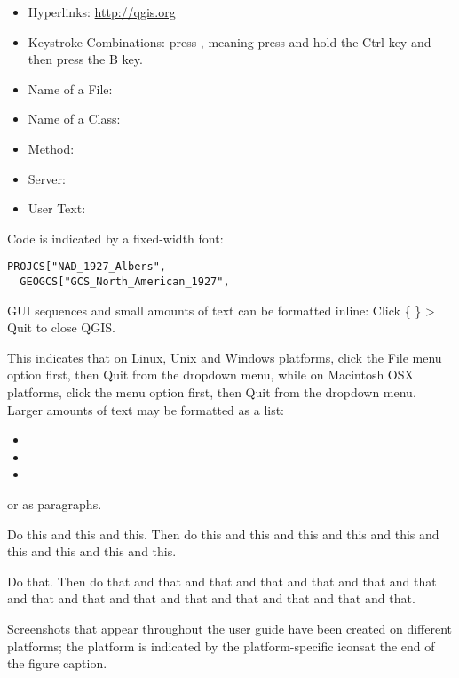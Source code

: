 \begin{itemize}[label=--]
\item Hyperlinks: \url{http://qgis.org}
\item Keystroke Combinations: press , meaning press and hold the Ctrl key and then press the B key.
\item Name of a File: 
\item Name of a Class: 
\item Method: 
\item Server: 
\item User Text: 
\end{itemize}

Code is indicated by a fixed-width font:
\begin{verbatim}
PROJCS["NAD_1927_Albers",
  GEOGCS["GCS_North_American_1927",
\end{verbatim}


GUI sequences and small amounts of text can be formatted inline: Click \{\nix{} \} > Quit to close QGIS.

This indicates that on Linux, Unix and Windows platforms, click the File menu option first, then Quit from the dropdown menu, while on Macintosh OSX platforms, click the \qg menu option first, then Quit from the dropdown menu. Larger amounts of text may be formatted as a list:

\begin{itemize}
\item {} 
\item {} 
\item {}
\end{itemize}

or as paragraphs.

\nix{} \osx{} Do this and this and this. Then do this and this and this and this and this and this and this and this and this.

\win{}Do that. Then do that and that and that and that and that and that and that and that and that and that and that and that and that and that and that.

Screenshots that appear throughout the user guide have been created on different platforms; the platform is indicated by the platform-specific iconsat the end of the figure caption.
